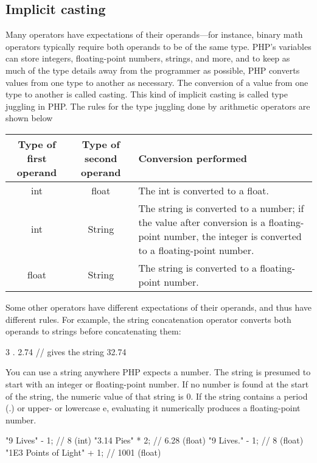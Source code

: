 \documentclass{report}
\begin{document}
\subsection{Implicit casting}
\bigbreak \noindent 
Many operators have expectations of their operands—for instance, binary math operators typically require both operands to be of the same type. PHP’s variables can store
integers, floating-point numbers, strings, and more, and to keep as much of the type
details away from the programmer as possible, PHP converts values from one type to
another as necessary.
\bigbreak \noindent 
The conversion of a value from one type to another is called casting. This kind of implicit
casting is called type juggling in PHP. The rules for the type juggling done by arithmetic
operators are shown below
\bigbreak \noindent 
\begin{center}
    \begin{tabular}{c|c|p{4cm}}
        \textbf{Type of first operand} & \textbf{Type of second operand} & \textbf{Conversion performed} \\
        \hline
        int & float & The int is converted to a float. \\
        int & String & The string is converted to a number; if the value after conversion is a floating-point number, the integer is converted to a floating-point number. \\ 
        float & String & The string is converted to a floating-point number.
    \end{tabular}
\end{center}
\bigbreak \noindent 
Some other operators have different expectations of their operands, and thus have different rules. For example, the string concatenation operator converts both operands to strings before concatenating them:
\bigbreak \noindent 
\begin{phpcode}
3 . 2.74 // gives the string 32.74
\end{phpcode}
\bigbreak \noindent 
You can use a string anywhere PHP expects a number. The string is presumed to start
with an integer or floating-point number. If no number is found at the start of the string,
the numeric value of that string is 0. If the string contains a period (.) or upper- or
lowercase e, evaluating it numerically produces a floating-point number.
\bigbreak \noindent 
\begin{phpcode}
"9 Lives" - 1; // 8 (int)
"3.14 Pies" * 2; // 6.28 (float)
"9 Lives." - 1; // 8 (float)
"1E3 Points of Light" + 1; // 1001 (float)
\end{phpcode}
\end{document}
